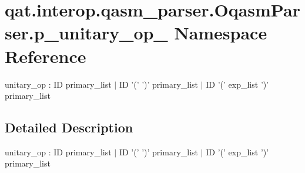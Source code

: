 \hypertarget{namespaceqat_1_1interop_1_1qasm__parser_1_1OqasmParser_1_1p__unitary__op__3}{\section{qat.\-interop.\-qasm\-\_\-parser.\-Oqasm\-Parser.\-p\-\_\-unitary\-\_\-op\-\_ Namespace Reference}
\label{namespaceqat_1_1interop_1_1qasm__parser_1_1OqasmParser_1_1p__unitary__op__3}
}


unitary\-\_\-op \-: I\-D primary\-\_\-list $|$ I\-D '(' ')' primary\-\_\-list $|$ I\-D '(' exp\-\_\-list ')' primary\-\_\-list  




\subsection{Detailed Description}
unitary\-\_\-op \-: I\-D primary\-\_\-list $|$ I\-D '(' ')' primary\-\_\-list $|$ I\-D '(' exp\-\_\-list ')' primary\-\_\-list 